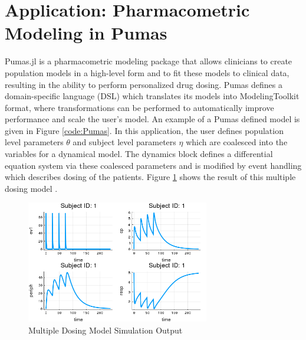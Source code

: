 \documentclass{juliacon}
\begin{document}
\section{Application: Pharmacometric Modeling in Pumas \label{sec:applications}}

Pumas.jl is a pharmacometric modeling package that 
allows clinicians to create population models in a high-level form
and to fit these models to clinical data, resulting in
the ability to perform personalized drug dosing. Pumas defines a domain-specific language (DSL) which 
translates its models into ModelingToolkit format, where 
transformations can be performed to automatically improve 
performance and scale the user's model. An example of a Pumas defined model is given in Figure \ref{code:Pumas}. In this application, the user defines population level parameters $\theta$ and subject level parameters $\eta$ which are coalesced into the variables for a dynamical model. The dynamics block defines a differential equation system via these coalesced parameters and is modified by event handling which describes dosing of the patients. Figure \ref{fig:Pumas-mr}
shows the result of this multiple dosing model \cite{mould_basic_2013}. 

\begin{figure}
    \centering
    \includegraphics[width=8cm]{multiple-responses.png}
    \caption{Multiple Dosing Model Simulation Output}
    \label{fig:Pumas-mr}
\end{figure}
\end{document}
